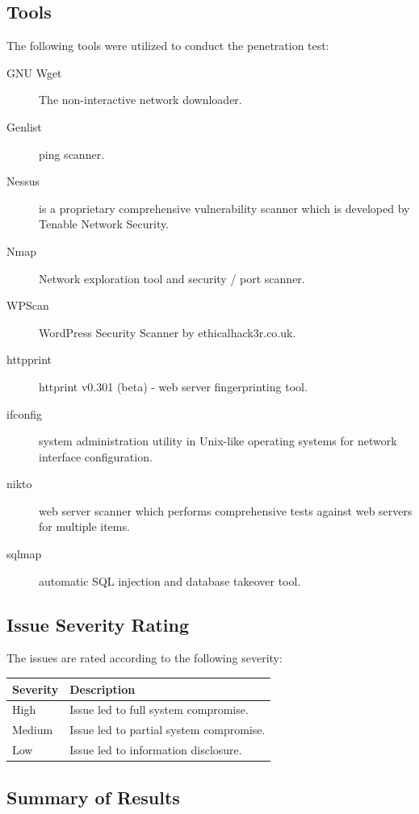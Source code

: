 \documentclass{article}
\begin{document}
\subsection{Tools}

The following tools were utilized to conduct the penetration test:

\begin{description}
  \item[GNU Wget] The non-interactive network downloader.
  \item[Genlist] ping scanner.
  \item[Nessus] is a proprietary comprehensive vulnerability scanner which is developed by Tenable Network Security.
  \item[Nmap] Network exploration tool and security / port scanner.
  \item[WPScan] WordPress Security Scanner by ethicalhack3r.co.uk.
  \item[httpprint] httprint v0.301 (beta) - web server fingerprinting tool.
  \item[ifconfig] system administration utility in Unix-like operating systems for network interface configuration.
  \item[nikto] web server scanner which performs comprehensive tests against web servers for multiple items.
  \item[sqlmap] automatic SQL injection and database takeover tool.
\end{description}

\subsection{Issue Severity Rating}

The issues are rated according to the following severity:

\begin{center}
  \begin{tabular}{| l | l |}
    \hline
    \textbf{Severity} & \textbf{Description} \\ \hline \hline
    High & Issue led to full system compromise. \\ \hline
    Medium & Issue led to partial system compromise. \\ \hline
    Low & Issue led to information disclosure. \\
    \hline
  \end{tabular}
\end{center}

\subsection{Summary of Results}
\end{document}

